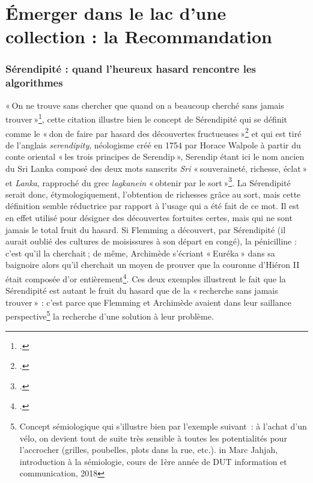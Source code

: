 \chapter{Émerger dans le lac d'une collection : la Recommandation}

\subsection{Sérendipité : quand l'heureux hasard rencontre les algorithmes}

« On ne trouve sans chercher que quand on a beaucoup cherché sans jamais trouver »\footcite{2015}, cette citation illustre bien le concept de Sérendipité qui se définit comme le « don de faire par hasard des découvertes fructueuses »\footcite{zotero-224} et qui est tiré de l’anglais \textit{serendipity}, néologisme créé en 1754 par Horace Walpole à partir du conte oriental « les trois principes de Serendip », Serendip étant ici le nom ancien du Sri Lanka composé des deux mots sanscrits \textit{Sri} « souveraineté, richesse, éclat » et \textit{Lanka}, rapproché du grec \textit{lagkanein} « obtenir par le sort »\footcite{zotero-224}. La Sérendipité serait donc, étymologiquement, l’obtention de richesses grâce au sort, mais cette définition semble réductrice par rapport à l’usage qui a été fait de ce mot. Il est en effet utilisé pour désigner des découvertes fortuites certes, mais qui ne sont jamais le total fruit du hasard. Si Flemming a découvert, par Sérendipité (il aurait oublié des cultures de moisissures à son départ en congé), la pénicilline : c’est qu’il la cherchait ; de même, Archimède s’écriant « Euréka » dans sa baignoire alors qu’il cherchait un moyen de prouver que la couronne d’Hiéron II était composée d’or entièrement\footcite[Annexe 1]{michel2019}. Ces deux exemples illustrent le fait que la Sérendipité est autant le fruit du hasard que de la « recherche sans jamais trouver » : c’est parce que Flemming et Archimède avaient dans leur saillance perspective\footnote{Concept sémiologique qui s’illustre bien par l’exemple suivant : à l’achat d’un vélo, on devient tout de suite très sensible à toutes les potentialités pour l’accrocher (grilles, poubelles, plots dans la rue, etc.). in Marc Jahjah, introduction à la sémiologie, cours de 1ère année de DUT information et communication, 2018 } la recherche d’une solution à leur problème.

